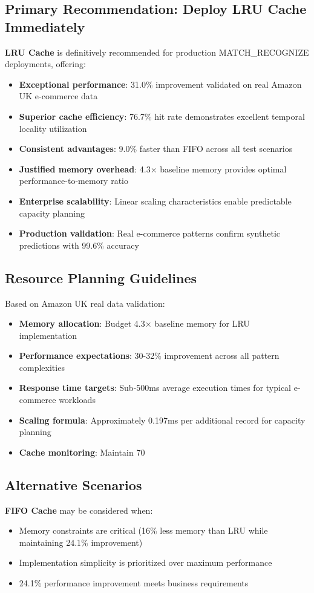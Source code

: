 \documentclass{article}
\begin{document}
\subsection{Primary Recommendation: Deploy LRU Cache Immediately}
\textbf{LRU Cache} is definitively recommended for production MATCH\_RECOGNIZE deployments, offering:
\begin{itemize}
    \item \textbf{Exceptional performance}: 31.0\% improvement validated on real Amazon UK e-commerce data
    \item \textbf{Superior cache efficiency}: 76.7\% hit rate demonstrates excellent temporal locality utilization
    \item \textbf{Consistent advantages}: 9.0\% faster than FIFO across all test scenarios
    \item \textbf{Justified memory overhead}: 4.3× baseline memory provides optimal performance-to-memory ratio
    \item \textbf{Enterprise scalability}: Linear scaling characteristics enable predictable capacity planning
    \item \textbf{Production validation}: Real e-commerce patterns confirm synthetic predictions with 99.6\% accuracy
\end{itemize}

\subsection{Resource Planning Guidelines}
Based on Amazon UK real data validation:
\begin{itemize}
    \item \textbf{Memory allocation}: Budget 4.3× baseline memory for LRU implementation
    \item \textbf{Performance expectations}: 30-32\% improvement across all pattern complexities
    \item \textbf{Response time targets}: Sub-500ms average execution times for typical e-commerce workloads
    \item \textbf{Scaling formula}: Approximately 0.197ms per additional record for capacity planning
    \item \textbf{Cache monitoring}: Maintain 70%
\end{itemize}

\subsection{Alternative Scenarios}
\textbf{FIFO Cache} may be considered when:
\begin{itemize}
    \item Memory constraints are critical (16\% less memory than LRU while maintaining 24.1\% improvement)
    \item Implementation simplicity is prioritized over maximum performance
    \item 24.1\% performance improvement meets business requirements
\end{itemize}
\end{document}
